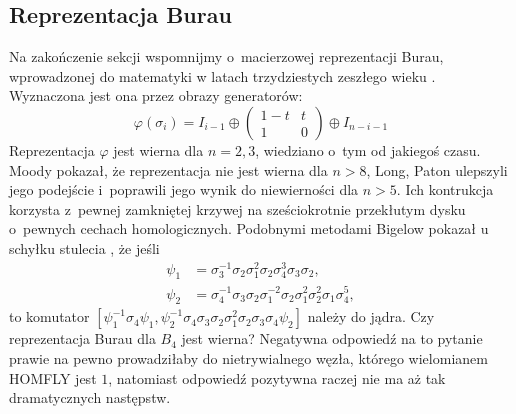 \subsection{Reprezentacja Burau}
Na zakończenie sekcji wspomnijmy o~macierzowej reprezentacji Burau, wprowadzonej do matematyki w latach trzydziestych zeszłego wieku \cite{burau33}.
%
%
Wyznaczona jest ona przez obrazy generatorów:
\begin{equation}
    \varphi(\sigma_i) = I_{i-1} \oplus \begin{pmatrix}
        1-t & t \\
        1   & 0
    \end{pmatrix} \oplus I_{n-i-1}
\end{equation}
Reprezentacja $\varphi$ jest wierna dla $n = 2, 3$, wiedziano o~tym od jakiegoś czasu. %
Moody \cite{moody91} pokazał, że reprezentacja nie jest wierna dla $n > 8$, Long, Paton \cite{paton93} ulepszyli jego podejście i~poprawili jego wynik do niewierności dla $n > 5$.
%
%
%
Ich kontrukcja korzysta z~pewnej zamkniętej krzywej na sześciokrotnie przekłutym dysku o~pewnych cechach homologicznych.
Podobnymi metodami Bigelow pokazał u schyłku stulecia \cite{bigelow99}, że jeśli
%
\begin{align}
    \psi_1 & = \sigma_3^{{-1}}\sigma_2\sigma_1^2\sigma_2\sigma_4^3\sigma_3\sigma_2, \\
\psi_2 & = \sigma_4^{{-1}}\sigma_3\sigma_2\sigma_1^{{-2}}\sigma_2\sigma_1^2\sigma_2^2\sigma_1\sigma_4^5,
\end{align}
to komutator $[\psi_1^{{-1}}\sigma_4\psi_1,\psi_2^{{-1}}\sigma_4\sigma_3\sigma_2\sigma_1^2\sigma_2\sigma_3\sigma_4\psi_2]$ należy do jądra.
Czy reprezentacja Burau dla $B_4$ jest wierna?
Negatywna odpowiedź na to pytanie prawie na pewno prowadziłaby do
nietrywialnego węzła, którego wielomianem HOMFLY jest $1$,
natomiast odpowiedź pozytywna raczej nie ma aż tak dramatycznych następstw.

